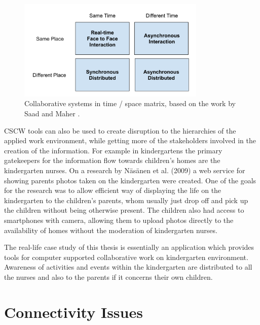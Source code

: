 \begin{figure}[t]
\begin{center}
\includegraphics[width=0.8\textwidth]{assets/cscw-matrix.png}
\end{center}
\caption{Collaborative systems in time / space matrix, based on the work by Saad and Maher \cite{saad_shared_1996}.}
\label{fig:cscw-matrix}
\end{figure}


CSCW tools can also be used to create disruption to the hierarchies of the applied work environment, while getting more of the stakeholders involved in the creation of the information. For example in kindergartens the primary gatekeepers for the information flow towards children's homes are the kindergarten nurses. On a research by Näsänen et al. (2009) a web service for showing parents photos taken on the kindergarten were created. One of the goals for the research was to allow efficient way of displaying the life on the kindergarten to the children's parents, whom usually just drop off and pick up the children without being otherwise present. The children also had access to smartphones with camera, allowing them to upload photos directly to the availability of homes without the moderation of kindergarten nurses. \cite{nasanen_mobile_2009}

The real-life case study of this thesis is essentially an application which provides tools for computer supported collaborative work on kindergarten environment. Awareness of activities and events within the kindergarten are distributed to all the nurses and also to the parents if it concerns their own children. 







\section{Connectivity Issues}

